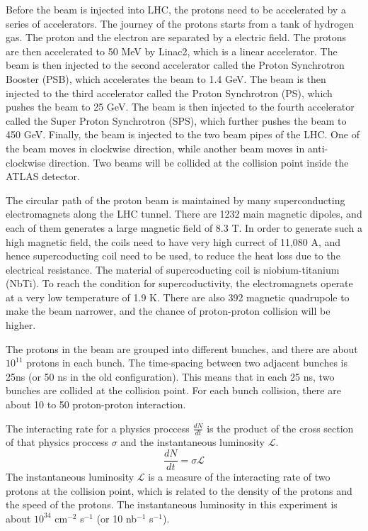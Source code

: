 Before the beam is injected into LHC, the protons need to be accelerated by a series of accelerators.
The journey of the protons starts from a tank of hydrogen gas.
The proton and the electron are separated by a electric field.
The protons are then accelerated to 50 MeV by Linac2, which is a linear accelerator.
The beam is then injected to the second accelerator called the Proton Synchrotron Booster (PSB), which accelerates the beam to 1.4 GeV.
The beam is then injected to the third accelerator called the Proton Synchrotron (PS), which pushes the beam to 25 GeV.
The beam is then injected to the fourth accelerator called the Super Proton Synchrotron (SPS), which further pushes the beam to 450 GeV.
Finally, the beam is injected to the two beam pipes of the LHC.
One of the beam moves in clockwise direction, while another beam moves in anti-clockwise direction.
Two beams will be collided at the collision point inside the ATLAS detector.
\cite{accelerator}

The circular path of the proton beam is maintained by many superconducting electromagnets along the LHC tunnel.
There are 1232 main magnetic dipoles, and each of them generates a large magnetic field of 8.3 T.
In order to generate such a high magnetic field, the coils need to have very high currect of 11,080 A, and hence supercoducting coil need to be used, to reduce the heat loss due to the electrical resistance.
The material of supercoducting coil is niobium-titanium (NbTi).
To reach the condition for supercoductivity, the electromagnets operate at a very low temperature of 1.9 K.
There are also 392 magnetic quadrupole to make the beam narrower, and the chance of proton-proton collision will be higher.
\cite{supermagnet,cryogenics}

The protons in the beam are grouped into different bunches, and there are about $10^{11}$ protons in each bunch.
The time-spacing between two adjacent bunches is 25ns (or 50 ns in the old configuration).
This means that in each 25 ns, two bunches are collided at the collision point.
For each bunch collision, there are about 10 to 50 proton-proton interaction.

The interacting rate for a physics proccess $\frac{dN}{dt}$ is the product of the cross section of that physics proccess $\sigma$ and the instantaneous luminosity $\mathcal{L}$.
\begin{equation}
\frac{dN}{dt} = \sigma \mathcal{L}
\end{equation}
The instantaneous luminosity $\mathcal{L}$ is a measure of the interacting rate of two protons at the collision point, which is related to the density of the protons and the speed of the protons.
The instantaneous luminosity in this experiment is about $10^{34}$ cm$^{-2}$ s$^{-1}$ (or 10 nb$^{-1}$ s$^{-1}$).

